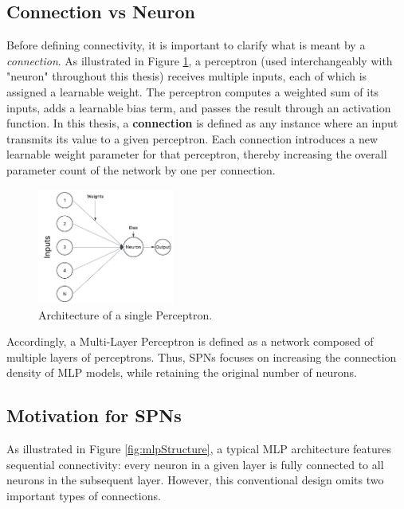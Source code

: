 \subsection{Connection vs Neuron}

Before defining connectivity, it is important to clarify what is meant by a \emph{connection}. As illustrated in Figure \ref{fig:perceptronArch}, a perceptron (used interchangeably with "neuron" throughout this thesis) receives multiple inputs, each of which is assigned a learnable weight. The perceptron computes a weighted sum of its inputs, adds a learnable bias term, and passes the result through an activation function. In this thesis, a \textbf{connection} is defined as any instance where an input transmits its value to a given perceptron. Each connection introduces a new learnable weight parameter for that perceptron, thereby increasing the overall parameter count of the network by one per connection.

\begin{figure}[h!]
\centering
\includegraphics[width=0.4\textwidth, height=0.2\textheight]{Figures/Methodology/perceptron_architecture.png}
\caption{Architecture of a single Perceptron.}
\label{fig:perceptronArch}
\end{figure}

Accordingly, a Multi-Layer Perceptron is defined as a network composed of multiple layers of perceptrons. Thus, SPNs focuses on increasing the connection density of MLP models, while retaining the original number of neurons.

\subsection{Motivation for SPNs}

As illustrated in Figure \ref{fig:mlpStructure}, a typical MLP architecture features sequential connectivity: every neuron in a given layer is fully connected to all neurons in the subsequent layer. However, this conventional design omits two important types of connections.

